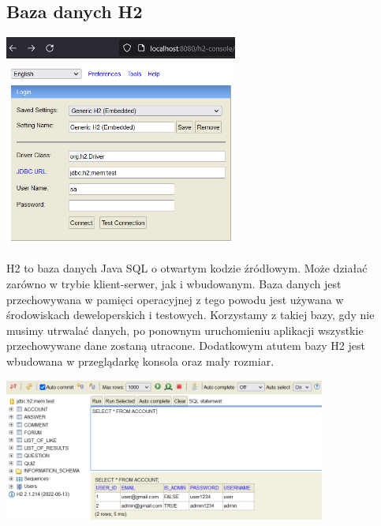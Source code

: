 \documentclass[10pt,a4paper]{report}
\begin{document}
\begin{adjustwidth}{2cm}{2cm}
\subsection{Baza danych H2}
\begin{minipage}{\linewidth}
\begin{center}
  \includegraphics[width=290px]{img/h2_console}
\end{center}
 \end{minipage}
\begin{minipage}{1\linewidth}
\vspace{0.3cm}
H2 to baza danych Java SQL o otwartym kodzie źródłowym. Może działać zarówno w trybie klient-serwer, jak i wbudowanym. Baza danych jest przechowywana w pamięci operacyjnej z tego powodu jest używana w środowiskach deweloperskich i testowych. Korzystamy z takiej bazy, gdy nie musimy utrwalać danych, po ponownym uruchomieniu aplikacji wszystkie przechowywane dane zostaną utracone. Dodatkowym atutem bazy H2 jest wbudowana w przeglądarkę konsola oraz mały rozmiar. \\
\end{minipage}
\begin{minipage}{1\linewidth}
\begin{center}
  \includegraphics[width=400px]{img/h2_console_database.png} 
\end{center}
\end{minipage}

\end{adjustwidth}
\end{document}
